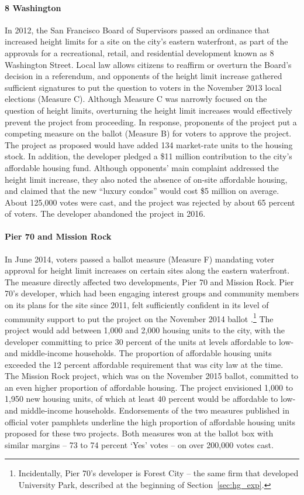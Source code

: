 \documentclass[article,12pt]{memoir}
\begin{document}
\paragraph{8 Washington} In 2012, the San Francisco Board of Supervisors passed an ordinance that increased height limits for a site on the city's eastern waterfront, as part of the approvals for a recreational, retail, and residential development known as 8 Washington Street. Local law allows citizens to reaffirm or overturn the Board's decision in a referendum, and opponents of the height limit increase gathered sufficient signatures to put the question to voters in the November 2013 local elections (Measure C). Although Measure C was narrowly focused on the question of height limits, overturning the height limit increases would effectively prevent the project from proceeding. In response, proponents of the project put a competing measure on the ballot (Measure B) for voters to approve the project.  The project as proposed would have added 134 market-rate units to the housing stock. In addition, the developer pledged a \$11 million contribution to the city's affordable housing fund. Although opponents' main complaint addressed the height limit increase, they also noted the absence of on-site affordable housing, and claimed that the new ``luxury condos'' would cost \$5 million on average.  About 125,000 votes were cast, and the project was rejected by about 65 percent of voters. The developer abandoned the project in 2016.

\paragraph{Pier 70 and Mission Rock} In June 2014, voters passed a ballot measure (Measure F) mandating voter approval for height limit increases on certain sites along the eastern waterfront. The measure directly affected two developments, Pier 70 and Mission Rock.  Pier 70's developer, which had been engaging interest groups and community members on its plans for the site since 2011, felt sufficiently confident in its level of community support to put the project on the November 2014 ballot \citep{kuwada_shaping_2015}.\footnote{Incidentally, Pier 70's developer is Forest City -- the same firm that developed University Park, described at the beginning of Section~\ref{sec:hg_exp}.} The project would add between 1,000 and 2,000 housing units to the city, with the developer committing to price 30 percent of the units at levels affordable to low- and middle-income households. The proportion of affordable housing units exceeded the 12 percent affordable requirement that was city law at the time. The Mission Rock project, which was on the November 2015 ballot, committed to an even higher proportion of affordable housing. The project envisioned 1,000 to 1,950 new housing units, of which at least 40 percent would be affordable to low- and middle-income households. Endorsements of the two measures published in official voter pamphlets underline the high proportion of affordable housing units proposed for these two projects.  Both measures won at the ballot box with similar margins -- 73 to 74 percent `Yes' votes -- on over 200,000 votes cast.
\end{document}
